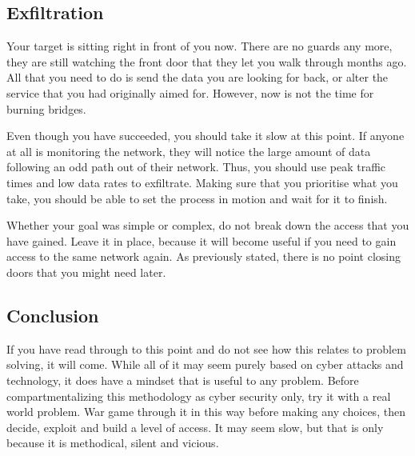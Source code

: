 		\subsection{Exfiltration}
			Your target is sitting right in front of you now.
			There are no guards any more, they are still watching the front door that they let you walk through months ago.
			All that you need to do is send the data you are looking for back, or alter the service that you had originally aimed for.
			However, now is not the time for burning bridges.

			Even though you have succeeded, you should take it slow at this point.
			If anyone at all is monitoring the network, they will notice the large amount of data following an odd path out of their network.
			Thus, you should use peak traffic times and low data rates to exfiltrate.
			Making sure that you prioritise what you take, you should be able to set the process in motion and wait for it to finish.

			Whether your goal was simple or complex, do not break down the access that you have gained.
			Leave it in place, because it will become useful if you need to gain access to the same network again.
			As previously stated, there is no point closing doors that you might need later.

		\subsection{Conclusion}
			If you have read through to this point and do not see how this relates to problem solving, it will come.
			While all of it may seem purely based on cyber attacks and technology, it does have a mindset that is useful to any problem.
			Before compartmentalizing this methodology as cyber security only, try it with a real world problem.
			War game through it in this way before making any choices, then decide, exploit and build a level of access.
			It may seem slow, but that is only because it is methodical, silent and vicious.

